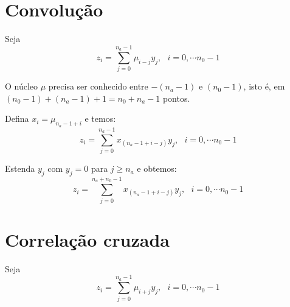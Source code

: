 \documentclass[10pt,a4paper]{article}%
\begin{document}
\section{Convolução}
Seja
$$z_i = \sum_{j=0}^{n_a-1} \mu_{i-j}y_j, ~~~i= 0, \cdots n_0 -1 $$

O núcleo $\mu$ precisa ser conhecido entre $-(n_a - 1)$ e $(n_0 - 1)$,
isto é, em $(n_0-1) + (n_a - 1) + 1 = n_0 + n_a -1$ pontos.


Defina $x_{i} = \mu_{n_a-1+i}$ e temos:
$$z_i = \sum_{j=0}^{n_a-1} x_{(n_a-1 +  i - j)}y_j, ~~~i= 0, \cdots n_0 -1 $$

Estenda $y_j$ com $y_j=0$ para $j\geq n_a$ e obtemos:
$$z_i = \sum_{j=0}^{n_a+n_0-1} x_{(n_a-1 +  i - j)}y_j, ~~~i= 0, \cdots n_0 -1 $$

\section{Correlação cruzada}
Seja
$$z_i = \sum_{j=0}^{n_a-1} \mu_{i+j}y_j, ~~~i= 0, \cdots n_0 -1 $$
\end{document}
